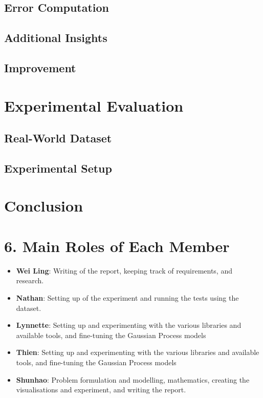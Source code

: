 \documentclass[letterpaper]{article}
\begin{document}
\subsection{Error Computation}


\subsection{Additional Insights}


\subsection{Improvement}



\section{Experimental Evaluation}



\subsection{Real-World Dataset}



\subsection{Experimental Setup}



\section{Conclusion}



\section{6. Main Roles of Each Member}
\begin{itemize}
\item \textbf{Wei Ling}: 
Writing of the report, keeping track of requirements, and research.
\item \textbf{Nathan}: 
Setting up of the experiment and running the tests using the dataset.
\item \textbf{Lynnette}: 
Setting up and experimenting with the various libraries and available tools, and fine-tuning the Gaussian Process models
\item \textbf{Thien}: 
Setting up and experimenting with the various libraries and available tools, and fine-tuning the Gaussian Process models
\item \textbf{Shunhao}: 
Problem formulation and modelling, mathematics, creating the visualisations and experiment, and writing the report.
\end{itemize}



\end{document}

